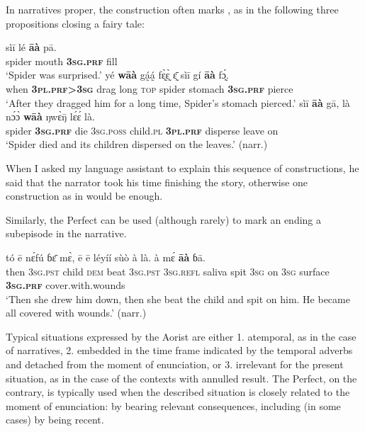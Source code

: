 \documentclass[output=paper,newtxmath,modfonts,nonflat,hidelinks]{langsci/langscibook}
\begin{document}
In narratives proper, the  construction often marks , as in the following three propositions closing a fairy tale:

\begin{exe} \ex
\begin{xlist} \ex
\gll	sìī	lé	\textbf{āà}	pā.\\
		spider	mouth	\textbf{3\textsc{sg}.\textsc{prf}}	fill\\
\glt ‘Spider was surprised.’
\ex
\gll yé	\textbf{wāà}	gá̰á̰	fɛ̰̀ɛ̰̀	ɛ̰̄	sìī	gí	\textbf{āà}	fɔ̰́.\\
		when	\textbf{3\textsc{pl}.\textsc{prf}>3\textsc{sg}}	drag	long	\textsc{top}	spider stomach	\textbf{3\textsc{sg}.\textsc{prf}}	pierce \\
\glt ‘After they dragged him for a long time, Spider’s stomach pierced.’
\ex	
\label{khachexspider}
\gll sìī	\textbf{āà}	gā,	là	nɔ́ɔ̀	\textbf{wāà}	ŋwɛ̀ŋ̄	lɛ́ɛ́	là.\\
		spider	\textbf{3\textsc{sg}.\textsc{prf}}	die	3\textsc{sg}.\textsc{poss}	child.\textsc{pl}	\textbf{3\textsc{pl}.\textsc{prf}}	disperse	leave	on\\
\glt  ‘Spider died and its children dispersed on the leaves.’ (narr.)
\end{xlist}
\end{exe}

When I asked my language assistant to explain this sequence of  constructions, he said that the narrator took his time finishing the story, otherwise one  construction as in  would be enough.

Similarly, the Perfect can be used (although rarely) to mark an  ending a subepisode in the narrative. 

\begin{exe} \ex
\gll 	tó	ē	nɛ́fú	ɓɛ̄	mɛ̀,	ē	ē	léyíí	sùò	à	là. à	mɛ́	\textbf{āà}	ɓā.\\
	then	3\textsc{sg}.\textsc{pst}	child	\textsc{dem}	beat	3\textsc{sg}.\textsc{pst}	3\textsc{sg}.\textsc{refl}	saliva	spit	3\textsc{sg}	on 3\textsc{sg}	surface	\textbf{3\textsc{sg}.\textsc{prf}}	cover.with.wounds\\
\glt ‘Then she drew him down, then she beat the child and spit on him. He became all covered with wounds.’ (narr.)
\end{exe}



Typical situations expressed by the Aorist are either 1. atemporal, as in the case of narratives, 2. embedded in the time frame indicated by the temporal adverbs and detached from the moment of enunciation, or 3. irrelevant for the present situation, as in the case of the contexts with annulled result. The Perfect, on the contrary, is typically used when the described situation  is closely related to the moment of enunciation:  by bearing relevant consequences, including (in some cases) by being recent.
\end{document}
